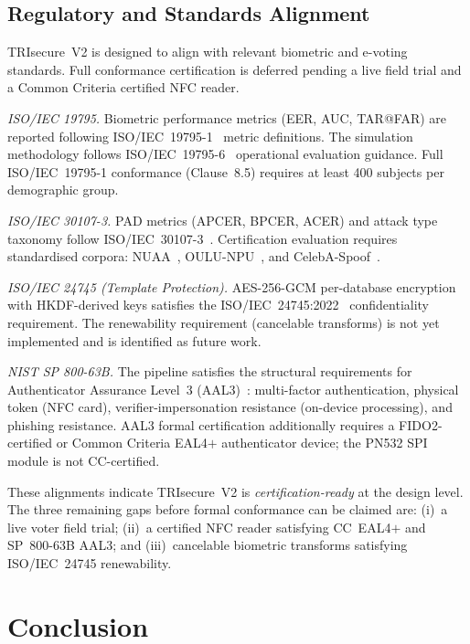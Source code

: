 \documentclass[pdflatex,sn-vancouver-num]{sn-jnl}%
\theoremstyle{thmstyleone}%
\theoremstyle{thmstyletwo}%
\theoremstyle{thmstylethree}%
\begin{document}
\subsection{Regulatory and Standards Alignment}\label{sec:regulatory}

TRIsecure~V2 is designed to align with relevant biometric and e-voting
standards. Full conformance certification is deferred pending a live field
trial and a Common Criteria certified NFC reader.

\textit{ISO/IEC 19795.} Biometric performance metrics (EER, AUC, TAR@FAR) are
reported following ISO/IEC~19795-1~\cite{iso19795} metric definitions. The
simulation methodology follows ISO/IEC~19795-6~\cite{iso19795_6} operational
evaluation guidance. Full ISO/IEC~19795-1 conformance (Clause~8.5) requires at
least 400 subjects per demographic group.

\textit{ISO/IEC 30107-3.} PAD metrics (APCER, BPCER, ACER) and attack type
taxonomy follow ISO/IEC~30107-3~\cite{iso30107}. Certification evaluation
requires standardised corpora: NUAA~\cite{tan2010nuaa},
OULU-NPU~\cite{boulkenafet2017oulu}, and
CelebA-Spoof~\cite{zhang2020minifasnet}.

\textit{ISO/IEC 24745 (Template Protection).} AES-256-GCM per-database
encryption with HKDF-derived keys satisfies the ISO/IEC~24745:2022~\cite{iso24745}
confidentiality requirement. The renewability requirement (cancelable transforms)
is not yet implemented and is identified as future work.

\textit{NIST SP 800-63B.} The pipeline satisfies the structural requirements
for Authenticator Assurance Level~3 (AAL3)~\cite{nist_sp800_63b}: multi-factor
authentication, physical token (NFC card), verifier-impersonation resistance
(on-device processing), and phishing resistance. AAL3 formal certification
additionally requires a FIDO2-certified or Common Criteria EAL4\(+\)
authenticator device; the PN532 SPI module is not CC-certified.

These alignments indicate TRIsecure~V2 is \emph{certification-ready} at the
design level. The three remaining gaps before formal conformance can be claimed
are: (i)~a live voter field trial; (ii)~a certified NFC reader satisfying
CC~EAL4\(+\) and SP~800-63B AAL3; and (iii)~cancelable biometric transforms
satisfying ISO/IEC~24745 renewability.

\section{Conclusion}\label{sec:conclusion}
\end{document}
